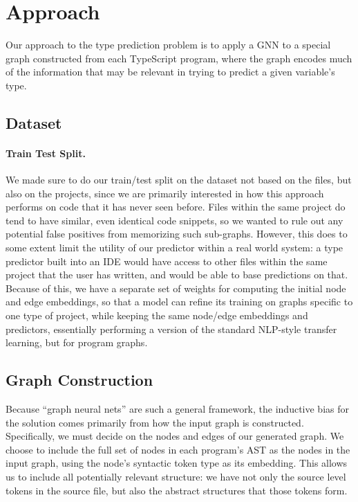 \section{Approach}
\label{sec:approach}

Our approach to the type prediction problem is to apply a GNN to a special graph constructed from each TypeScript program, where the graph encodes much of the information that may be relevant in trying to predict a given variable's type.

\subsection{Dataset}
\label{sec:dataset}


\paragraph{Train Test Split.}

We made sure to do our train/test split on the dataset not based on the files, but also on the projects, since we are primarily interested in how this approach performs on code that it has never seen before.
Files within the same project do tend to have similar, even identical code snippets, so we wanted to rule out any potential false positives from memorizing such sub-graphs.
However, this does to some extent limit the utility of our predictor within a real world system: a type predictor built into an IDE would have access to other files within the same project that the user has written, and would be able to base predictions on that.
Because of this, we have a separate set of weights for computing the initial node and edge embeddings, so that a model can refine its training on graphs specific to one type of project, while keeping the same node/edge embeddings and predictors, essentially performing a version of the standard NLP-style transfer learning, but for program graphs.

\subsection{Graph Construction}

Because ``graph neural nets'' are such a general framework, the inductive bias for the solution comes primarily from how the input graph is constructed.
Specifically, we must decide on the nodes and edges of our generated graph.
We choose to include the full set of nodes in each program's AST as the nodes in the input graph, using the node's syntactic token type as its embedding.
This allows us to include all potentially relevant structure: we have not only the source level tokens in the source file, but also the abstract structures that those tokens form.

